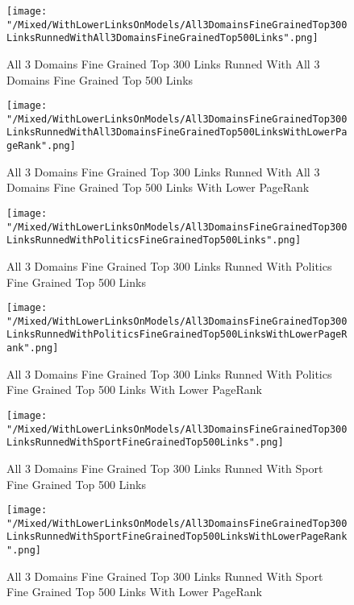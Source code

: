 \documentclass[thesis=M,english]{FITthesis}[2012/10/20]
\begin{document}
	\begin{figure}\centering
		\texttt{[image: "/Mixed/WithLowerLinksOnModels/All3DomainsFineGrainedTop300LinksRunnedWithAll3DomainsFineGrainedTop500Links".png]}
		\caption{All 3 Domains Fine Grained Top 300 Links Runned With All 3 Domains Fine Grained Top 500 Links}\label{}
	\end{figure}
	
	\begin{figure}\centering
		\texttt{[image: "/Mixed/WithLowerLinksOnModels/All3DomainsFineGrainedTop300LinksRunnedWithAll3DomainsFineGrainedTop500LinksWithLowerPageRank".png]}
		\caption{All 3 Domains Fine Grained Top 300 Links Runned With All 3 Domains Fine Grained Top 500 Links With Lower PageRank}\label{}
	\end{figure}
	
	\begin{figure}\centering
		\texttt{[image: "/Mixed/WithLowerLinksOnModels/All3DomainsFineGrainedTop300LinksRunnedWithPoliticsFineGrainedTop500Links".png]}
		\caption{All 3 Domains Fine Grained Top 300 Links Runned With Politics Fine Grained Top 500 Links}\label{}
	\end{figure}
	
	\begin{figure}\centering
		\texttt{[image: "/Mixed/WithLowerLinksOnModels/All3DomainsFineGrainedTop300LinksRunnedWithPoliticsFineGrainedTop500LinksWithLowerPageRank".png]}
		\caption{All 3 Domains Fine Grained Top 300 Links Runned With Politics Fine Grained Top 500 Links With Lower PageRank}\label{}
	\end{figure}
	
	\begin{figure}\centering
		\texttt{[image: "/Mixed/WithLowerLinksOnModels/All3DomainsFineGrainedTop300LinksRunnedWithSportFineGrainedTop500Links".png]}
		\caption{All 3 Domains Fine Grained Top 300 Links Runned With Sport Fine Grained Top 500 Links}\label{}
	\end{figure}
	
	\begin{figure}\centering
		\texttt{[image: "/Mixed/WithLowerLinksOnModels/All3DomainsFineGrainedTop300LinksRunnedWithSportFineGrainedTop500LinksWithLowerPageRank".png]}
		\caption{All 3 Domains Fine Grained Top 300 Links Runned With Sport Fine Grained Top 500 Links With Lower PageRank}\label{}
	\end{figure}
	
\end{document}

